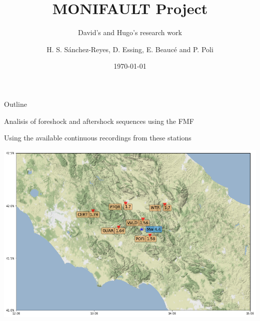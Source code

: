 \documentclass[aspectratio=43,9pt]{beamer}
\title{MONIFAULT Project}								%
\subtitle{David's and Hugo's research work}
\date{\today}
\author{H. S. S\'anchez-Reyes, D. Essing, E. Beauc\'e and P. Poli}								%
\institute{ISTerre, Universit\'e Grenoble Alpes}							%
\begin{document}
\maketitle


\begin{frame}{Outline}
\small \tableofcontents[hideallsubsections] 
\end{frame}


\begin{frame}{Analisis of foreshock and aftershock sequences using the FMF}
 
   \begin{minipage}{1\linewidth}
    \centering Using the available continuous recordings from these stations \\
    \vskip 0.4cm
    \begin{center}
     \includegraphics[width=1\linewidth]{figs/map_stations.png}     
    \end{center}
  \end{minipage}
   
\end{frame}
\end{document}
